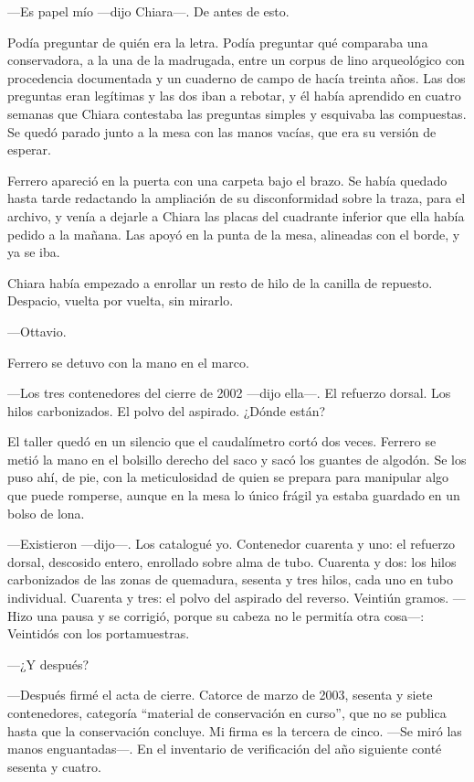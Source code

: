 ---Es papel mío ---dijo Chiara---. De antes de esto.

Podía preguntar de quién era la letra. Podía preguntar qué comparaba una conservadora, a la una de la madrugada, entre un corpus de lino arqueológico con procedencia documentada y un cuaderno de campo de hacía treinta años. Las dos preguntas eran legítimas y las dos iban a rebotar, y él había aprendido en cuatro semanas que Chiara contestaba las preguntas simples y esquivaba las compuestas. Se quedó parado junto a la mesa con las manos vacías, que era su versión de esperar.

Ferrero apareció en la puerta con una carpeta bajo el brazo. Se había quedado hasta tarde redactando la ampliación de su disconformidad sobre la traza, para el archivo, y venía a dejarle a Chiara las placas del cuadrante inferior que ella había pedido a la mañana. Las apoyó en la punta de la mesa, alineadas con el borde, y ya se iba.

Chiara había empezado a enrollar un resto de hilo de la canilla de repuesto. Despacio, vuelta por vuelta, sin mirarlo.

---Ottavio.

Ferrero se detuvo con la mano en el marco.

---Los tres contenedores del cierre de 2002 ---dijo ella---. El refuerzo dorsal. Los hilos carbonizados. El polvo del aspirado. ¿Dónde están?

El taller quedó en un silencio que el caudalímetro cortó dos veces. Ferrero se metió la mano en el bolsillo derecho del saco y sacó los guantes de algodón. Se los puso ahí, de pie, con la meticulosidad de quien se prepara para manipular algo que puede romperse, aunque en la mesa lo único frágil ya estaba guardado en un bolso de lona.

---Existieron ---dijo---. Los catalogué yo. Contenedor cuarenta y uno: el refuerzo dorsal, descosido entero, enrollado sobre alma de tubo. Cuarenta y dos: los hilos carbonizados de las zonas de quemadura, sesenta y tres hilos, cada uno en tubo individual. Cuarenta y tres: el polvo del aspirado del reverso. Veintiún gramos. ---Hizo una pausa y se corrigió, porque su cabeza no le permitía otra cosa---: Veintidós con los portamuestras.

---¿Y después?

---Después firmé el acta de cierre. Catorce de marzo de 2003, sesenta y siete contenedores, categoría ``material de conservación en curso'', que no se publica hasta que la conservación concluye. Mi firma es la tercera de cinco. ---Se miró las manos enguantadas---. En el inventario de verificación del año siguiente conté sesenta y cuatro.

